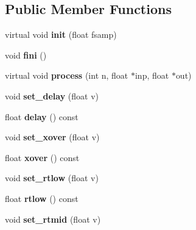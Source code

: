 \subsection*{Public Member Functions}
\begin{DoxyCompactItemize}
\item 
\mbox{\label{class_ms_1_1_zita_reverb_afbf04ec13d5a8545ff2fb8fb17b89013}} 
virtual void {\bfseries init} (float fsamp)
\item 
\mbox{\label{class_ms_1_1_zita_reverb_aa9ac522519349e86f7ff86a4084c9bf1}} 
void {\bfseries fini} ()
\item 
\mbox{\label{class_ms_1_1_zita_reverb_a360d6095afc286fceda68f8de49db424}} 
virtual void {\bfseries process} (int n, float $\ast$inp, float $\ast$out)
\item 
\mbox{\label{class_ms_1_1_zita_reverb_ae953b2f9f14970c1af154e910dfdaaf1}} 
void {\bfseries set\+\_\+delay} (float v)
\item 
\mbox{\label{class_ms_1_1_zita_reverb_a55eac68f0f135a27b7a653430b93a92b}} 
float {\bfseries delay} () const
\item 
\mbox{\label{class_ms_1_1_zita_reverb_ad78a23b4c2e985414b734b1baffc94bf}} 
void {\bfseries set\+\_\+xover} (float v)
\item 
\mbox{\label{class_ms_1_1_zita_reverb_a190e5f084b3c5edbee884bfe21f7bc6a}} 
float {\bfseries xover} () const
\item 
\mbox{\label{class_ms_1_1_zita_reverb_ac55c6fa02965127b42bf1d4cec9b40c0}} 
void {\bfseries set\+\_\+rtlow} (float v)
\item 
\mbox{\label{class_ms_1_1_zita_reverb_acb26b47569b139a2093e76c3ec2da4de}} 
float {\bfseries rtlow} () const
\item 
\mbox{\label{class_ms_1_1_zita_reverb_a58e76887cf1ceb3e238c2bdad81bff17}} 
void {\bfseries set\+\_\+rtmid} (float v)

\end{DoxyCompactItemize}
